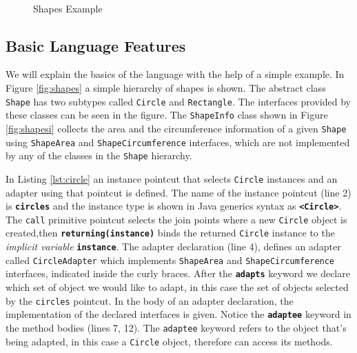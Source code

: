 \documentclass{llncs}
\begin{document}
\begin{figure}
\centering

~~~

\label{fig:example1}
\caption{Shapes Example}
\end{figure}

\subsection{Basic Language Features}
We will explain the basics of the language with the help of a simple example. In Figure \ref{fig:shapes} a simple hierarchy of shapes is shown. The abstract class \texttt{Shape} has two subtypes called \texttt{Circle} and \texttt{Rectangle}. The interfaces provided by these classes can be seen in the figure. The \texttt{ShapeInfo} class shown in Figure \ref{fig:shapesi} collects the area and the circumference information of a given \texttt{Shape} using \texttt{ShapeArea} and \texttt{ShapeCircumference} interfaces, which are not implemented by any of the classes in the \texttt{Shape} hierarchy. 

In Listing \ref{lst:circle} an instance pointcut that selects \texttt{Circle} instances and an adapter using that pointcut is defined. The name of the instance pointcut (line 2) is \textbf{\texttt{circles}} and the instance type is shown in Java generics syntax as \texttt{\textbf{<Circle>}}. The \texttt{call} primitive pointcut selects the join points where a new \texttt{Circle} object is created,then \texttt{\textbf{returning(instance)}} binds the returned \texttt{Circle} instance to the \emph{implicit variable} \texttt{\textbf{instance}}. The adapter declaration (line 4), defines an adapter called \texttt{CircleAdapter} which implements \texttt{ShapeArea} and \texttt{ShapeCircumference} interfaces, indicated inside the curly braces. After the \texttt{\textbf{adapts}} keyword we declare which set of object we would like to adapt, in this case the set of objects selected by the \texttt{circles} pointcut. In the body of an adapter declaration, the implementation of the declared interfaces is given. Notice the \texttt{\textbf{adaptee}} keyword in the method bodies (lines 7, 12). The \texttt{adaptee} keyword refers to the object that's being adapted, in this case a \texttt{Circle} object, therefore can access its methods. 
\end{document}
